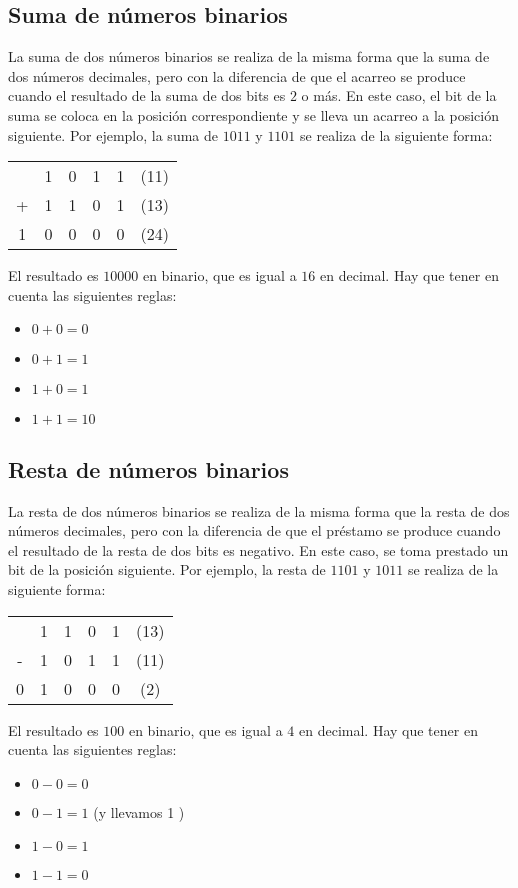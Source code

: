 \subsection{Suma de números binarios}
La suma de dos números binarios se realiza de la misma forma que la suma de dos números decimales, pero con la diferencia de que el acarreo se produce cuando el resultado de la suma de dos bits es $2$ o más. En este caso, el bit de la suma se coloca en la posición correspondiente y se lleva un acarreo a la posición siguiente.
Por ejemplo, la suma de $1011$ y $1101$ se realiza de la siguiente forma:
\begin{table}[h]
    \centering
    \begin{tabular}{cccccc}
        & 1 & 0 & 1 & 1 & (11) \\
        + & 1 & 1 & 0 & 1 & (13) \\ \hline
        1 & 0 & 0 & 0 & 0 & (24)
    \end{tabular}
\end{table}
El resultado es $10000$ en binario, que es igual a $16$ en decimal.
Hay que tener en cuenta las siguientes reglas:
\begin{itemize}
    \item $0 + 0 = 0$
    \item $0 + 1 = 1$
    \item $1 + 0 = 1$
    \item $1 + 1 = 10$
\end{itemize}

\subsection{Resta de números binarios}
La resta de dos números binarios se realiza de la misma forma que la resta de dos números decimales, pero con la diferencia de que el préstamo se produce cuando el resultado de la resta de dos bits es negativo. En este caso, se toma prestado un bit de la posición siguiente.
Por ejemplo, la resta de $1101$ y $1011$ se realiza de la siguiente forma:
\begin{table}[h]
    \centering
    \begin{tabular}{cccccc}
        & 1 & 1 & 0 & 1 & (13) \\
        - & 1 & 0 & 1 & 1 & (11) \\ \hline
        0 & 1 & 0 & 0 & 0 & (2)
    \end{tabular}
\end{table}
El resultado es $100$ en binario, que es igual a $4$ en decimal.
Hay que tener en cuenta las siguientes reglas:
\begin{itemize}
    \item $0 - 0 = 0$
    \item $0 - 1 = 1$ (y llevamos 1 )
    \item $1 - 0 = 1$
    \item $1 - 1 = 0$
\end{itemize}

